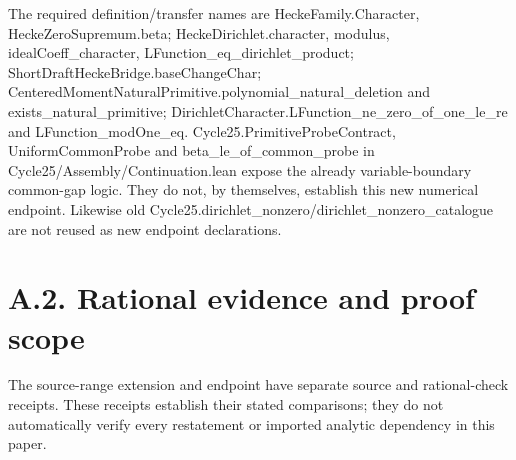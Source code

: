 \documentclass[11pt,a4paper]{article}
\newcommand{\sourcecode}[1]{{\small\ttfamily #1}}
\begin{document}
The required \sourcecode{definition/\allowbreak{}transfer} names are
\sourcecode{Hecke\allowbreak{}Family.\allowbreak{}Character}, \sourcecode{Hecke\allowbreak{}Zero\allowbreak{}Supremum.\allowbreak{}beta};
\sourcecode{Hecke\allowbreak{}Dirichlet.\allowbreak{}character}, modulus,
\sourcecode{ideal\allowbreak{}Coeff\_\allowbreak{}\allowbreak{}character},
\sourcecode{LFunction\_\allowbreak{}\allowbreak{}eq\_\allowbreak{}\allowbreak{}dirichlet\_\allowbreak{}\allowbreak{}product};
\sourcecode{Short\allowbreak{}Draft\allowbreak{}Hecke\allowbreak{}Bridge.\allowbreak{}base\allowbreak{}Change\allowbreak{}Char};
\sourcecode{Centered\allowbreak{}Moment\allowbreak{}Natural\allowbreak{}Primitive.\allowbreak{}polynomial\_\allowbreak{}\allowbreak{}natural\_\allowbreak{}\allowbreak{}deletion}
and \sourcecode{exists\_\allowbreak{}\allowbreak{}natural\_\allowbreak{}\allowbreak{}primitive};
\sourcecode{Dirichlet\allowbreak{}Character.\allowbreak{}LFunction\_\allowbreak{}\allowbreak{}ne\_\allowbreak{}\allowbreak{}zero\_\allowbreak{}\allowbreak{}of\_\allowbreak{}\allowbreak{}one\_\allowbreak{}\allowbreak{}le\_\allowbreak{}\allowbreak{}re} and
\sourcecode{LFunction\_\allowbreak{}\allowbreak{}mod\allowbreak{}One\_\allowbreak{}\allowbreak{}eq}. \sourcecode{Cycle25.\allowbreak{}Primitive\allowbreak{}Probe\allowbreak{}Contract},
\sourcecode{Uniform\allowbreak{}Common\allowbreak{}Probe} and \sourcecode{beta\_\allowbreak{}\allowbreak{}le\_\allowbreak{}\allowbreak{}of\_\allowbreak{}\allowbreak{}common\_\allowbreak{}\allowbreak{}probe} in
\sourcecode{Cycle25/\allowbreak{}Assembly/\allowbreak{}Continuation.\allowbreak{}lean} expose the already
variable-boundary common-gap logic. They do not, by themselves,
establish this new numerical endpoint. Likewise old
\sourcecode{Cycle25.\allowbreak{}dirichlet\_\allowbreak{}\allowbreak{}nonzero/\allowbreak{}dirichlet\_\allowbreak{}\allowbreak{}nonzero\_\allowbreak{}\allowbreak{}catalogue} are
not reused as new endpoint declarations.

\hypertarget{a.2.-rational-evidence-and-proof-scope}{%
\section{A.2. Rational evidence and proof
scope}\label{a.2.-rational-evidence-and-proof-scope}}

The source-range extension and endpoint have separate source and
rational-check receipts. These receipts establish their stated
comparisons; they do not automatically verify every restatement or
imported analytic dependency in this paper.
\end{document}
